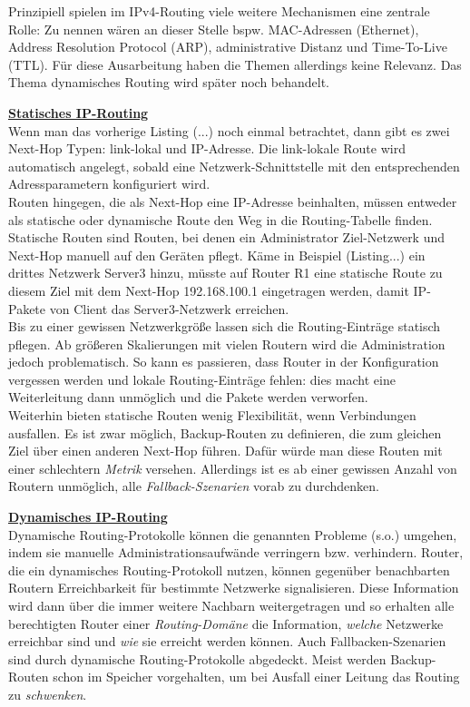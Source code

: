 Prinzipiell spielen im IPv4-Routing viele weitere Mechanismen eine zentrale Rolle: Zu nennen wären an dieser Stelle bspw. MAC-Adressen (Ethernet), Address Resolution Protocol (ARP), administrative Distanz und Time-To-Live (TTL). Für diese Ausarbeitung haben die Themen allerdings keine Relevanz. Das Thema \glqq dynamisches Routing\grqq{} wird später noch behandelt.

\textbf{\underline{Statisches IP-Routing}}\\
Wenn man das vorherige Listing (...) noch einmal betrachtet, dann gibt es zwei Next-Hop Typen: link-lokal und \glqq IP-Adresse\grqq{}. Die link-lokale Route wird automatisch angelegt, sobald eine Netzwerk-Schnittstelle mit den entsprechenden Adressparametern konfiguriert wird.\\
Routen hingegen, die als Next-Hop eine IP-Adresse beinhalten, müssen entweder als statische oder dynamische Route den Weg in die Routing-Tabelle finden. Statische Routen sind Routen, bei denen ein Administrator Ziel-Netzwerk und Next-Hop manuell auf den Geräten pflegt. Käme in Beispiel (Listing...) ein drittes Netzwerk \glqq Server3\grqq{} hinzu, müsste auf Router R1 eine statische Route zu diesem Ziel mit dem Next-Hop 192.168.100.1 eingetragen werden, damit IP-Pakete von Client das Server3-Netzwerk erreichen.\\
Bis zu einer gewissen Netzwerkgröße lassen sich die Routing-Einträge statisch pflegen. Ab größeren Skalierungen mit vielen Routern wird die Administration jedoch problematisch. So kann es passieren, dass Router in der Konfiguration vergessen werden und lokale Routing-Einträge fehlen: dies macht eine Weiterleitung dann unmöglich und die Pakete werden verworfen.\\
Weiterhin bieten statische Routen wenig Flexibilität, wenn Verbindungen ausfallen. Es ist zwar möglich, Backup-Routen zu definieren, die zum gleichen Ziel über einen anderen Next-Hop führen. Dafür würde man diese Routen mit einer schlechtern \textit{Metrik} versehen. Allerdings ist es ab einer gewissen Anzahl von Routern unmöglich, alle \textit{Fallback-Szenarien} vorab zu durchdenken.

\textbf{\underline{Dynamisches IP-Routing}}\\
Dynamische Routing-Protokolle können die genannten Probleme (s.o.) umgehen, indem sie manuelle Administrationsaufwände verringern bzw. verhindern. Router, die ein dynamisches Routing-Protokoll nutzen, können gegenüber benachbarten Routern Erreichbarkeit für bestimmte Netzwerke signalisieren. Diese Information wird dann über die immer weitere Nachbarn weitergetragen und so erhalten alle berechtigten Router einer \textit{Routing-Domäne} die Information, \textit{welche} Netzwerke erreichbar sind und \textit{wie} sie erreicht werden können. Auch Fallbacken-Szenarien sind durch dynamische Routing-Protokolle abgedeckt. Meist werden Backup-Routen schon im Speicher vorgehalten, um bei Ausfall einer Leitung das Routing zu \textit{schwenken}.

